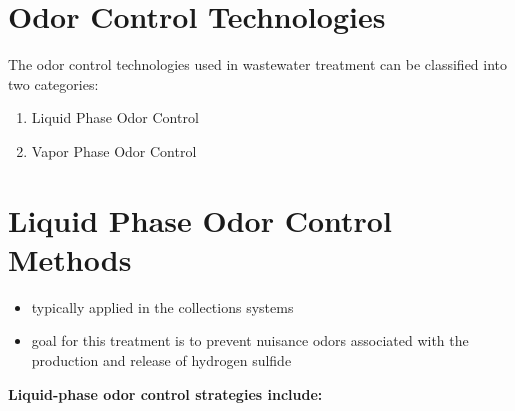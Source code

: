 \section{Odor Control Technologies}
The odor control technologies used in wastewater treatment can be classified into two categories:
\begin{enumerate}
\item Liquid Phase Odor Control
\item Vapor Phase Odor Control
\end{enumerate}

\section{Liquid Phase Odor Control Methods}
\begin{itemize}
	\item typically applied in the collections systems
	\item goal for this treatment is to prevent nuisance odors associated with the production and release of hydrogen sulfide
\end{itemize}
\textbf{Liquid-phase odor control strategies include:}

